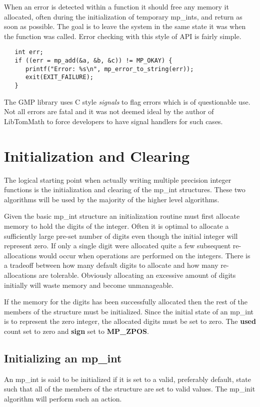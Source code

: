 \documentclass[b5paper]{book}
\begin{document}
When an error is detected within a function it should free any memory it allocated, often during the initialization of
temporary mp\_ints, and return as soon as possible.  The goal is to leave the system in the same state it was when the 
function was called.  Error checking with this style of API is fairly simple.

\begin{verbatim}
   int err;
   if ((err = mp_add(&a, &b, &c)) != MP_OKAY) {
      printf("Error: %s\n", mp_error_to_string(err));
      exit(EXIT_FAILURE);
   }
\end{verbatim}

The GMP \cite{GMP} library uses C style \textit{signals} to flag errors which is of questionable use.  Not all errors are fatal 
and it was not deemed ideal by the author of LibTomMath to force developers to have signal handlers for such cases.

\section{Initialization and Clearing}
The logical starting point when actually writing multiple precision integer functions is the initialization and 
clearing of the mp\_int structures.  These two algorithms will be used by the majority of the higher level algorithms.

Given the basic mp\_int structure an initialization routine must first allocate memory to hold the digits of
the integer.  Often it is optimal to allocate a sufficiently large pre-set number of digits even though
the initial integer will represent zero.  If only a single digit were allocated quite a few subsequent re-allocations
would occur when operations are performed on the integers.  There is a tradeoff between how many default digits to allocate
and how many re-allocations are tolerable.  Obviously allocating an excessive amount of digits initially will waste 
memory and become unmanageable.  

If the memory for the digits has been successfully allocated then the rest of the members of the structure must
be initialized.  Since the initial state of an mp\_int is to represent the zero integer, the allocated digits must be set
to zero.  The \textbf{used} count set to zero and \textbf{sign} set to \textbf{MP\_ZPOS}.

\subsection{Initializing an mp\_int}
An mp\_int is said to be initialized if it is set to a valid, preferably default, state such that all of the members of the
structure are set to valid values.  The mp\_init algorithm will perform such an action.
\end{document}
